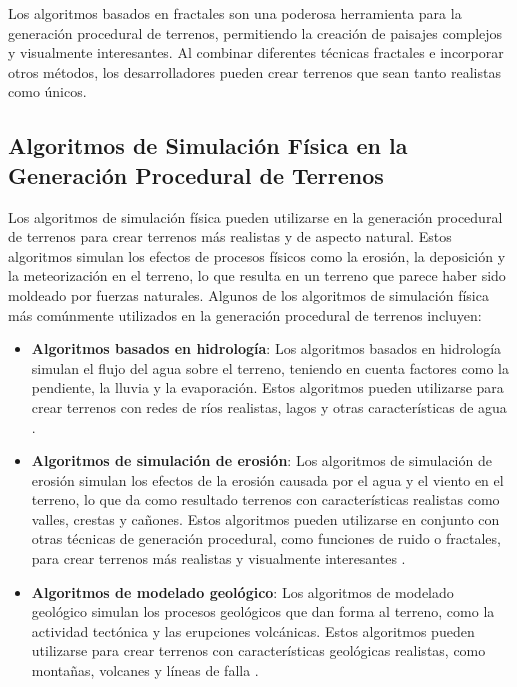 Los algoritmos basados en fractales son una poderosa herramienta para la generación procedural de terrenos, permitiendo la creación de paisajes complejos y visualmente interesantes. Al combinar diferentes técnicas fractales e incorporar otros métodos, los desarrolladores pueden crear terrenos que sean tanto realistas como únicos.

\subsection{Algoritmos de Simulación Física en la Generación Procedural de Terrenos}

Los algoritmos de simulación física pueden utilizarse en la generación procedural de terrenos para crear terrenos más realistas y de aspecto natural. Estos algoritmos simulan los efectos de procesos físicos como la erosión, la deposición y la meteorización en el terreno, lo que resulta en un terreno que parece haber sido moldeado por fuerzas naturales. Algunos de los algoritmos de simulación física más comúnmente utilizados en la generación procedural de terrenos incluyen:

\begin{itemize}
    \item \textbf{Algoritmos basados en hidrología}: Los algoritmos basados en hidrología simulan el flujo del agua sobre el terreno, teniendo en cuenta factores como la pendiente, la lluvia y la evaporación. Estos algoritmos pueden utilizarse para crear terrenos con redes de ríos realistas, lagos y otras características de agua \cite{AlgoritmosHidrologia} \cite{HidrologiaDocumento}.
    
    \item \textbf{Algoritmos de simulación de erosión}: Los algoritmos de simulación de erosión simulan los efectos de la erosión causada por el agua y el viento en el terreno, lo que da como resultado terrenos con características realistas como valles, crestas y cañones. Estos algoritmos pueden utilizarse en conjunto con otras técnicas de generación procedural, como funciones de ruido o fractales, para crear terrenos más realistas y visualmente interesantes \cite{AlgoritmosErosion} \cite{ErosionReddit}.
    
    \item \textbf{Algoritmos de modelado geológico}: Los algoritmos de modelado geológico simulan los procesos geológicos que dan forma al terreno, como la actividad tectónica y las erupciones volcánicas. Estos algoritmos pueden utilizarse para crear terrenos con características geológicas realistas, como montañas, volcanes y líneas de falla \cite{ModeladoGeologico} \cite{GeologiaDocumento}.
\end{itemize}

